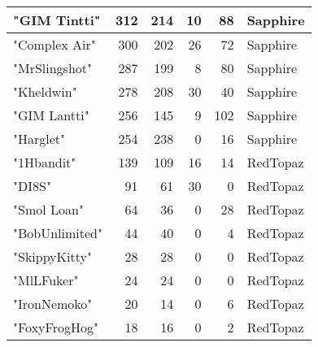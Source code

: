 \documentclass{article}
\begin{document}
\begin{table}[htbp]
\begin{tabular}{|l|r|r|r|r|l|}
"GIM Tintti" & 312 & 214 & 10 & 88 & Sapphire \\ \hline
"Complex Air" & 300 & 202 & 26 & 72 & Sapphire \\ \hline
"MrSlingshot" & 287 & 199 & 8 & 80 & Sapphire \\ \hline
"Kheldwin" & 278 & 208 & 30 & 40 & Sapphire \\ \hline
"GIM Lantti" & 256 & 145 & 9 & 102 & Sapphire \\ \hline
"Harglet" & 254 & 238 & 0 & 16 & Sapphire \\ \hline
"1Hbandit" & 139 & 109 & 16 & 14 & RedTopaz \\ \hline
"DI8S" & 91 & 61 & 30 & 0 & RedTopaz \\ \hline
"Smol Loan" & 64 & 36 & 0 & 28 & RedTopaz \\ \hline
"BobUnlimited" & 44 & 40 & 0 & 4 & RedTopaz \\ \hline
"SkippyKitty" & 28 & 28 & 0 & 0 & RedTopaz \\ \hline
"MlLFuker" & 24 & 24 & 0 & 0 & RedTopaz \\ \hline
"IronNemoko" & 20 & 14 & 0 & 6 & RedTopaz \\ \hline
"FoxyFrogHog" & 18 & 16 & 0 & 2 & RedTopaz \\ \hline
\end{tabular}
\end{table}
\end{document}
